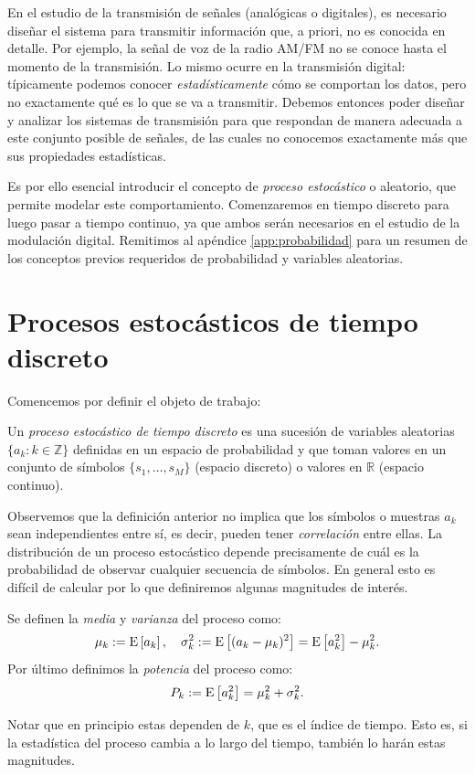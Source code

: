 En el estudio de la transmisión de señales (analógicas o digitales), es necesario diseñar el sistema para transmitir información que, a priori, no es conocida en detalle. Por ejemplo, la señal de voz de la radio AM/FM no se conoce hasta el momento de la transmisión. Lo mismo ocurre en la transmisión digital: típicamente podemos conocer \emph{estadísticamente} cómo se comportan los datos, pero no exactamente qué es lo que se va a transmitir. Debemos entonces poder diseñar y analizar los sistemas de transmisión para que respondan de manera adecuada a este conjunto posible de señales, de las cuales no conocemos exactamente más que sus propiedades estadísticas.

Es por ello esencial introducir el concepto de \emph{proceso estocástico} o aleatorio, que permite modelar este comportamiento. Comenzaremos en tiempo discreto para luego pasar a tiempo continuo, ya que ambos serán necesarios en el estudio de la modulación digital. Remitimos al apéndice \ref{app:probabilidad} para un resumen de los conceptos previos requeridos de probabilidad y variables aleatorias.

\section{Procesos estocásticos de tiempo discreto}\label{sec:procesos td}

Comencemos por definir el objeto de trabajo:
\begin{definicion}\label{def:proceso_td}
    Un \emph{proceso estocástico de tiempo discreto} es una sucesión de variables aleatorias $\{a_k:k\in\mathbb{Z}\}$ definidas en un espacio de probabilidad y que toman valores en un conjunto de símbolos $\{s_1,\ldots,s_M\}$ (espacio discreto) o valores en $\mathbb{R}$ (espacio continuo).
\end{definicion}

Observemos que la definición anterior no implica que los símbolos o muestras $a_k$ sean independientes entre sí, es decir, pueden tener \emph{correlación} entre ellas. La distribución de un proceso estocástico depende precisamente de cuál es la probabilidad de observar cualquier secuencia de símbolos. En general esto es difícil de calcular por lo que definiremos algunas magnitudes de interés.

\begin{definicion}\label{def:media_var_td}
    Se definen la \emph{media} y \emph{varianza} del proceso como:
    \begin{equation*}
        \mu_k := \mathrm{E}\left[a_k\right], \quad \sigma^2_k := \mathrm{E}\left[(a_k-\mu_k)^2\right] = \mathrm{E}\left[a_k^2\right] - \mu_k^2.
    \end{equation*}
    Por último definimos la \emph{potencia} del proceso como:
    \begin{equation*}
        P_k := \mathrm{E}\left[a_k^2\right] = \mu_k^2 + \sigma_k^2.
    \end{equation*}
\end{definicion}
Notar que en principio estas dependen de $k$, que es el índice de tiempo. Esto es, si la estadística del proceso cambia a lo largo del tiempo, también lo harán estas magnitudes.


